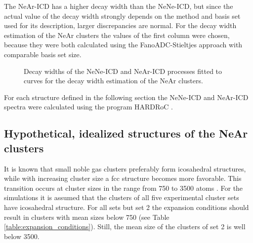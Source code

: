 The NeAr-ICD has a higher decay width than the NeNe-ICD, but since the
actual value of the decay width strongly depends on the method and basis set
used for its description, larger discrepancies are normal. For the decay
width estimation of the NeAr clusters the values of the first column were
chosen, because they were both calculated using the FanoADC-Stieltjes approach
with comparable basis set size.

\begin{figure}[h]
 \centering
 
 \caption{Decay widths of the NeNe-ICD and NeAr-ICD processes fitted to
          curves for the decay width estimation of the NeAr clusters.}
 \label{figure:fitted_NeAr_widths}
\end{figure}

For each structure defined in the following section the NeNe-ICD and NeAr-ICD
spectra were calculated using the program HARDRoC \cite{HARDRoC}.




\subsection{Hypothetical, idealized structures of the NeAr clusters}

It is known that small noble gas clusters preferably form icosahedral structures,
while with increasing cluster size a fcc structure becomes more favorable. This transition
occurs at cluster sizes in the range from 750 to 3500 atoms \cite{Martin96,Doye97,Hartke02}.
For the simulations it is assumed that the clusters of all
five experimental cluster sets have 
icosahedral structure. For all sets but set 2 the expansion conditions should result in clusters 
with mean sizes below 750 (see Table \ref{table:expansion_conditions}). Still,
the mean size of the clusters of set 2 is well below 3500.

